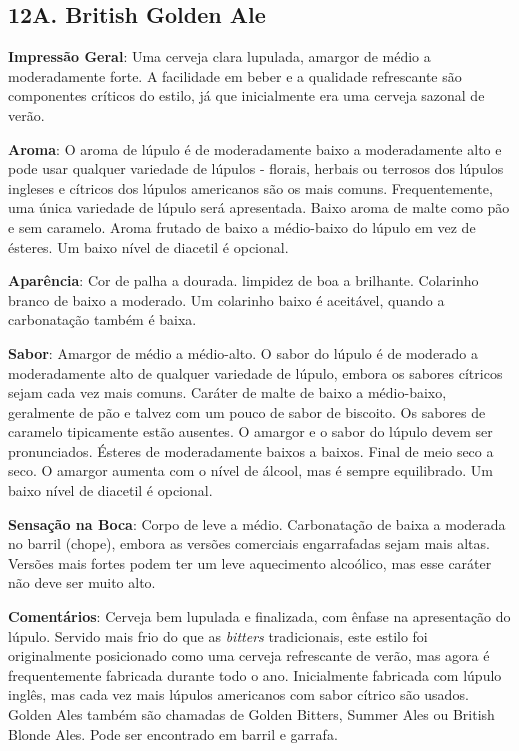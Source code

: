 \subsection*{12A. British Golden Ale}
\textbf{Impressão Geral}: Uma cerveja clara lupulada, amargor de médio a moderadamente forte. A facilidade em beber e a qualidade refrescante são componentes críticos do estilo, já que inicialmente era uma cerveja sazonal de verão.

\textbf{Aroma}: O aroma de lúpulo é de moderadamente baixo a moderadamente alto e pode usar qualquer variedade de lúpulos - florais, herbais ou terrosos dos lúpulos ingleses e cítricos dos lúpulos americanos são os mais comuns. Frequentemente, uma única variedade de lúpulo será apresentada. Baixo aroma de malte como pão e sem caramelo. Aroma frutado de baixo a médio-baixo do lúpulo em vez de ésteres. Um baixo nível de diacetil é opcional.

\textbf{Aparência}: Cor de palha a dourada. limpidez de boa a brilhante. Colarinho branco de baixo a moderado. Um colarinho baixo é aceitável, quando a carbonatação também é baixa.

\textbf{Sabor}: Amargor de médio a médio-alto. O sabor do lúpulo é de moderado a moderadamente alto de qualquer variedade de lúpulo, embora os sabores cítricos sejam cada vez mais comuns. Caráter de malte de baixo a médio-baixo, geralmente de pão e talvez com um pouco de sabor de biscoito. Os sabores de caramelo tipicamente estão ausentes. O amargor e o sabor do lúpulo devem ser pronunciados. Ésteres de moderadamente baixos a baixos. Final de meio seco a seco. O amargor aumenta com o nível de álcool, mas é sempre equilibrado. Um baixo nível de diacetil é opcional.

\textbf{Sensação na Boca}: Corpo de leve a médio. Carbonatação de baixa a moderada no barril (chope), embora as versões comerciais engarrafadas sejam mais altas. Versões mais fortes podem ter um leve aquecimento alcoólico, mas esse caráter não deve ser muito alto.

\textbf{Comentários}: Cerveja bem lupulada e finalizada, com ênfase na apresentação do lúpulo. Servido mais frio do que as \textit{bitters} tradicionais, este estilo foi originalmente posicionado como uma cerveja refrescante de verão, mas agora é frequentemente fabricada durante todo o ano. Inicialmente fabricada com lúpulo inglês, mas cada vez mais lúpulos americanos com sabor cítrico são usados. Golden Ales também são chamadas de Golden Bitters, Summer Ales ou British Blonde Ales. Pode ser encontrado em barril e garrafa.

